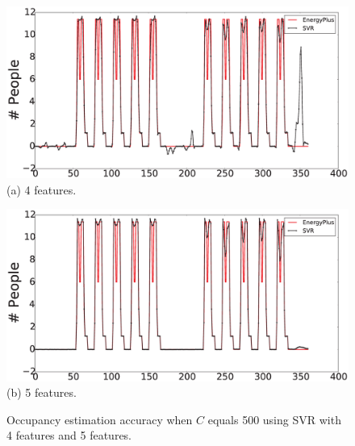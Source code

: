 \begin{figure}[h]
\begin{minipage}{\textwidth}
\centering\includegraphics[width=5in]{./Pics/500C4Features.eps}
(a) 4 features.
\end{minipage}
\hfill

\vspace{3ex}

\noindent\begin{minipage}{\textwidth}
\centering\includegraphics[width=5in]{./Pics/500C5Features.eps}
(b) 5 features.
\end{minipage}
\hfill
\caption{Occupancy estimation accuracy when $C$ equals 500 using SVR with 4 features and 5 features.}\label{fig:compare2}
\end{figure}

